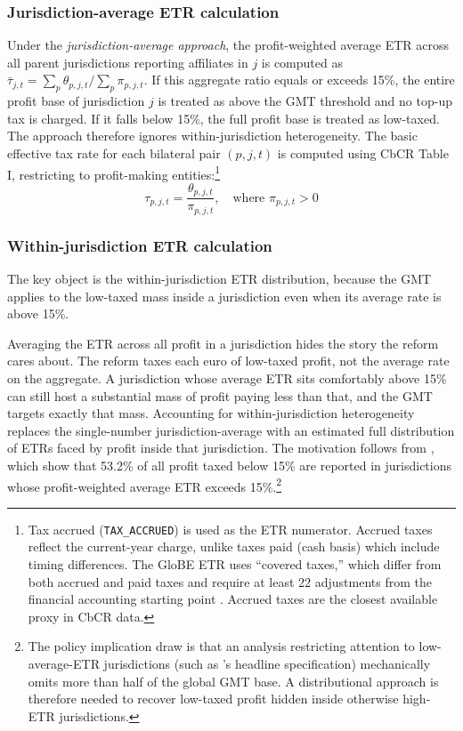 \documentclass[11pt,a4paper]{article}
\newcommand{\code}[1]{\texttt{#1}}
\begin{document}
\subsubsection{Jurisdiction-average ETR calculation}\label{sec:etr_calc}

Under the \emph{jurisdiction-average approach}, the profit-weighted average ETR across all parent jurisdictions reporting affiliates in $j$ is computed as $\bar{\tau}_{j,t} = \sum_p \theta_{p,j,t} / \sum_p \pi_{p,j,t}$. If this aggregate ratio equals or exceeds 15\%, the entire profit base of jurisdiction $j$ is treated as above the GMT threshold and no top-up tax is charged. If it falls below 15\%, the full profit base is treated as low-taxed. The approach therefore ignores within-jurisdiction heterogeneity. The basic effective tax rate for each bilateral pair $(p, j, t)$ is computed using CbCR Table I, restricting to profit-making entities:\footnote{Tax accrued (\code{TAX\_ACCRUED}) is used as the ETR numerator. Accrued taxes reflect the current-year charge, unlike taxes paid (cash basis) which include timing differences. The GloBE ETR uses ``covered taxes,'' which differ from both accrued and paid taxes and require at least 22 adjustments from the financial accounting starting point \citep{hanlon2023}. Accrued taxes are the closest available proxy in CbCR data.}
\begin{equation}\label{eq:etr}
\tau_{p,j,t} = \frac{\theta_{p,j,t}}{\pi_{p,j,t}}, \quad \text{where } \pi_{p,j,t} > 0
\end{equation}

\subsubsection{Within-jurisdiction ETR calculation}\label{sec:distributional}

The key object is the within-jurisdiction ETR distribution, because the GMT applies to the low-taxed mass inside a jurisdiction even when its average rate is above 15\%.

Averaging the ETR across all profit in a jurisdiction hides the story the reform cares about. The reform taxes each euro of low-taxed profit, not the average rate on the aggregate. A jurisdiction whose average ETR sits comfortably above 15\% can still host a substantial mass of profit paying less than that, and the GMT targets exactly that mass. Accounting for within-jurisdiction heterogeneity replaces the single-number jurisdiction-average with an estimated full distribution of ETRs faced by profit inside that jurisdiction. The motivation follows from \citet{hugger2026}, which show that 53.2\% of all profit taxed below 15\% are reported in jurisdictions whose profit-weighted average ETR exceeds 15\%.\footnote{The policy implication \citet{hugger2026} draw is that an analysis restricting attention to low-average-ETR jurisdictions (such as \citet{barake2022}'s headline specification) mechanically omits more than half of the global GMT base. A distributional approach is therefore needed to recover low-taxed profit hidden inside otherwise high-ETR jurisdictions.} 
\end{document}
